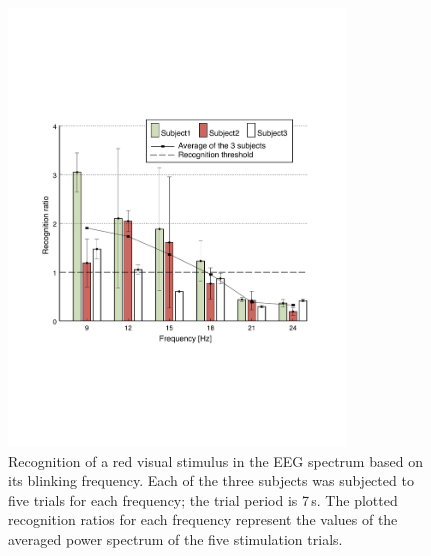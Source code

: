 \documentclass[smallextended]{svjour3}
\begin{document}
\begin{figure}
\center
\includegraphics[width=0.8\textwidth]{figures/frequence-v2.pdf}
\caption{Recognition of a red visual stimulus in the EEG spectrum based on its blinking frequency. Each of the three subjects was subjected to five trials for each frequency; the trial period is 7\,s. The plotted recognition ratios for each frequency represent the values of the averaged power spectrum of the five stimulation trials.} \label{fig:graph-frequences}
\end{figure}
\end{document}
